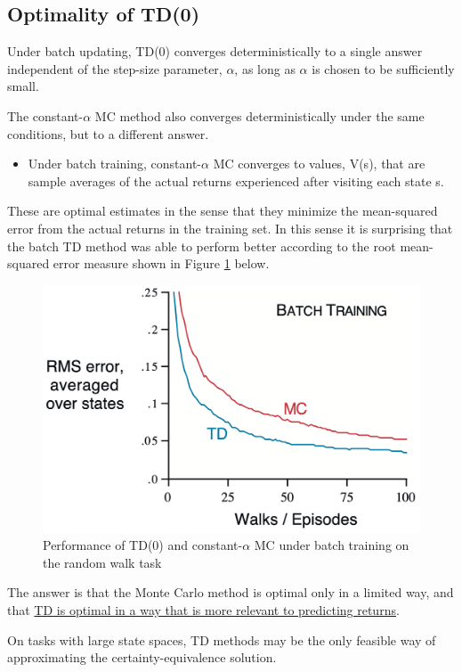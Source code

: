 \documentclass[12pt, a4paper]{article}
\begin{document}
\subsection{Optimality of TD(0)}\label{optimality-of-td(0)}

Under batch updating, TD(0) converges deterministically to a single answer independent of the step-size parameter, $\alpha$, as long as $\alpha$ is chosen to be sufficiently small.

The constant-$\alpha$ MC method also converges deterministically under the same conditions, but to a different answer.
\begin{itemize}
  \item Under batch training, constant-$\alpha$ MC converges to values, V(s), that are sample averages of the actual returns experienced after visiting each state s.
\end{itemize}

These are optimal estimates in the sense that they minimize the mean-squared error from the actual returns in the training set. In this sense it is surprising that the batch TD method was able to perform better according to the root mean-squared error measure shown in Figure \ref{fig:batch-training-td-vs-mc} below.

\begin{figure}[H]
  \centering
    \includegraphics[width=0.6\columnwidth]{images/batch-training-td-vs-mc.png}
    \caption{Performance of TD(0) and constant-$\alpha$ MC under batch training on the random walk task}
    \label{fig:batch-training-td-vs-mc}
\end{figure}

The answer is that the Monte Carlo method is optimal only in a limited way, and
that \uline{TD is optimal in a way that is more relevant to predicting returns}.

On tasks with large state spaces, TD methods may be the only feasible way of approximating the certainty-equivalence solution.
\end{document}
